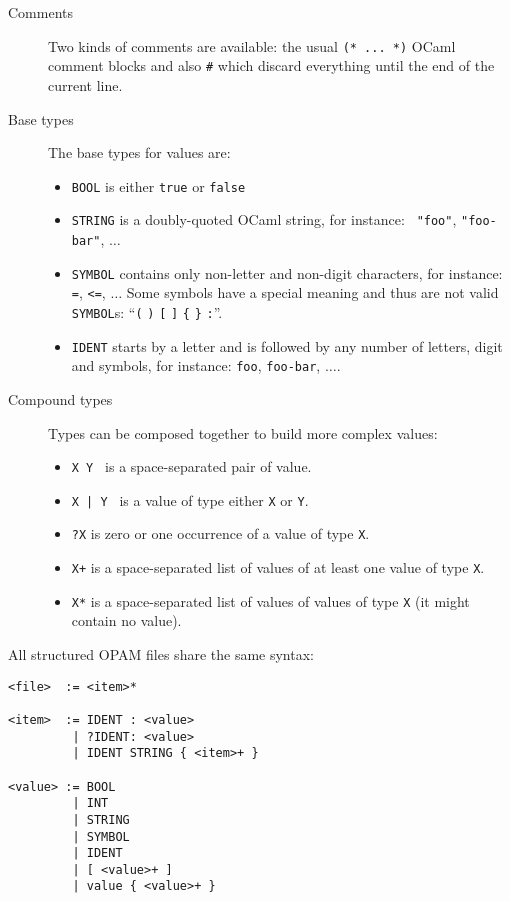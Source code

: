 \documentclass[a4paper,11pt]{article}
\begin{document}
\begin{description}

\item[Comments] Two kinds of comments are available: the usual
  \verb+(* ... *)+ OCaml comment blocks and also \verb+#+ which
  discard everything until the end of the current line.

\item[Base types] The base types for values are:

\begin{itemize}
\item {\tt BOOL} is  either {\tt true} or {\tt false}
\item {\tt STRING} is a doubly-quoted OCaml string, for instance: {\tt
  "foo"}, {\tt "foo-bar"}, $\ldots$
\item {\tt SYMBOL} contains only non-letter and non-digit characters,
  for instance: {\tt =}, {\tt <=}, $\ldots$ Some symbols have a special
  meaning and thus are not valid {\tt SYMBOL}s: ``\verb+(+ \verb+)+
  \verb+[+ \verb+]+ \verb+{+ \verb+}+ \verb+:+''.
\item {\tt IDENT} starts by a letter and is followed by any number of
  letters, digit and symbols, for instance: {\tt foo}, {\tt foo-bar},
  $\ldots$.
\end{itemize}


\item[Compound types] Types can be composed together to build more
  complex values:

\begin{itemize}
\item {\tt X Y } is a space-separated pair of value.
\item {\tt X | Y } is a value of type either {\tt X} or {\tt Y}.
\item {\tt ?X} is zero or one occurrence of a value of type {\tt X}.
\item {\tt X+} is a space-separated list of values of at least one value
  of type {\tt X}.
\item {\tt X*} is a space-separated list of values of values of type
  {\tt X} (it might contain no value).
\end{itemize}

\end{description}

All structured OPAM files share the same syntax:

{\small
\begin{Verbatim}[frame=single]
<file>  := <item>*

<item>  := IDENT : <value>
         | ?IDENT: <value>
         | IDENT STRING { <item>+ }

<value> := BOOL
         | INT
         | STRING
         | SYMBOL
         | IDENT
         | [ <value>+ ]
         | value { <value>+ }
\end{Verbatim}
}
\end{document}
